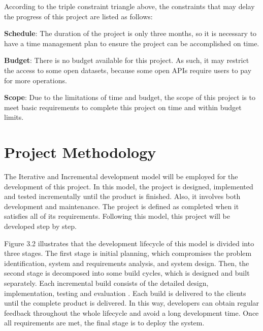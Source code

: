 According to the triple constraint triangle above, the constraints that may delay the progress of this project are listed as follows:

\textbf{Schedule}: The duration of the project is only three months, so it is necessary to have a time management plan to ensure the project can be accomplished on time.

\textbf{Budget}: There is no budget available for this project. As such, it may restrict the access to some open datasets, because some open APIs require users to pay for more operations.

\textbf{Scope}: Due to the limitations of time and budget, the scope of this project is to meet basic requirements to complete this project on time and within budget limits.


\section{Project Methodology}

The Iterative and Incremental development model will be employed for the development of this project. In this model, the project is designed, implemented and tested incrementally until the product is finished. Also, it involves both development and maintenance. The project is defined as completed when it satisfies all of its requirements. Following this model, this project will be developed step by step. 


Figure 3.2 illustrates that the development lifecycle of this model is divided into three stages. The first stage is initial planning, which compromises the problem identification, system and requirements analysis, and system design. Then, the second stage is decomposed into some build cycles, which is designed and built separately. Each incremental build consists of the detailed design, implementation, testing and evaluation \cite{4_houston_2011}. Each build is delivered to the clients until the complete product is delivered. In this way, developers can obtain regular feedback throughout the whole lifecycle and avoid a long development time. Once all requirements are met, the final stage is to deploy the system.

